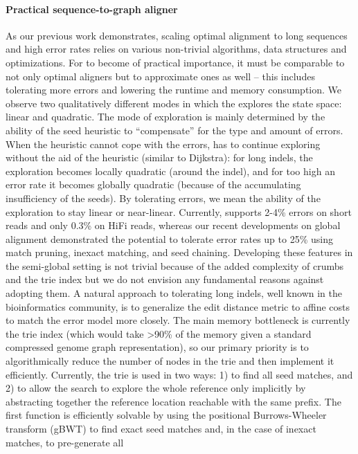 \paragraph{Practical sequence-to-graph aligner}
As our previous work demonstrates, scaling optimal \A alignment to long
sequences and high error rates relies on various non-trivial algorithms, data
structures and optimizations. For \astarix to become of practical importance, it
must be comparable to not only optimal aligners but to approximate ones as well
-- this includes tolerating more errors and lowering the runtime and memory
consumption. We observe two qualitatively different modes in which the \A
explores the state space: linear and quadratic. The mode of exploration is
mainly determined by the ability of the seed heuristic to ``compensate'' for the
type and amount of errors. When the heuristic cannot cope with the errors, \A
has to continue exploring without the aid of the heuristic (similar to
Dijkstra): for long indels, the exploration becomes locally quadratic (around
the indel), and for too high an error rate it becomes globally quadratic
(because of the accumulating insufficiency of the seeds). By tolerating errors,
we mean the ability of the exploration to stay linear or near-linear. Currently,
\astarix supports 2-4\% errors on short reads and only 0.3\% on HiFi reads,
whereas our recent developments on global alignment demonstrated the potential
to tolerate error rates up to 25\% using match pruning, inexact matching, and
seed chaining. Developing these features in the semi-global setting is not
trivial because of the added complexity of crumbs and the trie index but we do
not envision any fundamental reasons against adopting them. A natural approach
to tolerating long indels, well known in the bioinformatics community, is to
generalize the edit distance metric to affine costs to match the error model
more closely. The main memory bottleneck is currently the trie index (which
would take >90\% of the memory given a standard compressed genome graph
representation), so our primary priority is to algorithmically reduce the number
of nodes in the trie and then implement it efficiently. Currently, the trie is
used in two ways: 1) to find all seed matches, and 2) to allow the search \A to
explore the whole reference only implicitly by abstracting together the
reference location reachable with the same prefix. The first function is
efficiently solvable by using the positional Burrows-Wheeler transform (gBWT) to
find exact seed matches and, in the case of inexact matches, to pre-generate all
